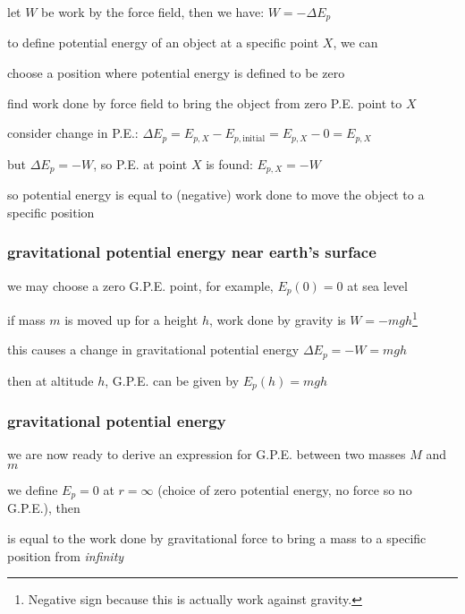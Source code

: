 let $W$ be work by the force field, then we have: $\boxed{W=-\Delta E_p}$

\vspace*{\baselineskip}

to define potential energy of an object at a specific point $X$, we can

\begin{compactenum}
	\item[(1)] choose a position where potential energy is defined to be zero
	
	\item[(2)] find work done by force field to bring the object from zero P.E. point to $X$
	
	\item[(3)] consider change in P.E.: $\Delta E_p = E_{p,X} - E_{p,\text{initial}} = E_{p,X} - 0 = E_{p,X}$
	
	but $\Delta E_p = -W$, so P.E. at point $X$ is found: $E_{p,X} = -W$
	
\end{compactenum}

so potential energy is equal to (negative) work done to move the object to a specific position

\subsubsection*{gravitational potential energy near earth's surface}

we may choose a zero G.P.E. point, for example, $E_p(0) = 0$ at sea level

if mass $m$ is moved up for a height $h$, work done by gravity is $W=-mgh$\footnote{Negative sign because this is actually work against gravity.}

this causes a change in gravitational potential energy $\Delta E_p=-W=mg h$

then at altitude $h$, G.P.E. can be given by $E_p(h)=mgh$

\subsubsection{gravitational potential energy}


we are now ready to derive an expression for G.P.E. between two masses $M$ and $m$

we define $E_p=0$ at $r=\infty$ (choice of zero potential energy, no force so no G.P.E.), then

\begin{ilight}
	 is equal to the work done by gravitational force to bring a mass to a specific position from \emph{infinity}
\end{ilight} 

